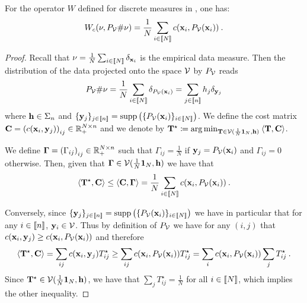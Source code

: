 \begin{lemma}
    For the operator $W$ defined for discrete measures in , one has:
    \begin{align}
        W_c(\nu, P_{{\mathcal{V}}} \# \nu) = \frac{1}{N} \sum_{i \in {[\![N]\!]}} c(\mathbf{x}_i, P_{{\mathcal{V}}}(\mathbf{x}_i)) \:.
    \end{align}
\end{lemma}

\begin{proof}
Recall that $\nu = \frac{1}{N} \sum_{i \in {[\![N]\!]}} \delta_{{\mathbf{x}}_i}$ is the empirical data measure. Then the distribution of the data projected onto the space ${\mathcal{V}}$ by $P_{{\mathcal{V}}}$ reads
\begin{align}
    P_{{\mathcal{V}}} \# \nu = \frac{1}{N} \sum_{i \in {[\![N]\!]}} \delta_{P_{{\mathcal{V}}}({\mathbf{x}}_{i})} = \sum_{j \in {[\![n]\!]}} h_j \delta_{{\mathbf{y}}_{j}}
\end{align} 
where ${\mathbf{h}} \in \Sigma_n$ and $\{{\mathbf{y}}_j \}_{j \in {[\![n]\!]}} = \text{supp}\left( \{P_{{\mathcal{V}}}({\mathbf{x}}_{i}) \}_{i \in {[\![N]\!]}} \right)$. We define the cost matrix ${\mathbf{C}} = \left( c({\mathbf{x}}_i, {\mathbf{y}}_j) \right)_{ij} \in \mathbb{R}_+^{N \times n}$ and we denote by ${\mathbf{T}}^\star \coloneqq \operatorname*{arg\,min}_{{\mathbf{T}} \in {\mathcal{V}}(\frac{1}{N} \bm{1}_N, {\mathbf{h}})} \: \langle {\mathbf{T}}, {\mathbf{C}} \rangle$.

We define $\mathbf{\Gamma} = \left( \Gamma_{ij} \right)_{ij} \in \mathbb{R}_+^{N \times n}$ such that $\Gamma_{ij} = \frac{1}{N}$ if ${\mathbf{y}}_j = P_{{\mathcal{V}}}({\mathbf{x}}_i)$ and $\Gamma_{ij} = 0$ otherwise.
Then, given that $\mathbf{\Gamma} \in {\mathcal{V}}(\frac{1}{N} \bm{1}_N, {\mathbf{h}})$ we have that
\begin{align}
    \langle {\mathbf{T}}^\star, {\mathbf{C}} \rangle \leq \langle {\mathbf{C}}, \mathbf{\Gamma} \rangle = \frac{1}{N} \sum_{i \in {[\![N]\!]}} c(\mathbf{x}_i, P_{{\mathcal{V}}}(\mathbf{x}_i)) \:.
\end{align}

Conversely, since $\{{\mathbf{y}}_j \}_{j \in {[\![n]\!]}} = \text{supp}\left( \{P_{{\mathcal{V}}}({\mathbf{x}}_{i}) \}_{i \in {[\![N]\!]}} \right)$ we have in particular that for any $i \in {[\![n]\!]}$, ${\mathbf{y}}_i \in {\mathcal{V}}$. Thus by definition of $P_{{\mathcal{V}}}$ we have for any $(i,j)$ that $c({\mathbf{x}}_i, {\mathbf{y}}_j) \geq c({\mathbf{x}}_i, P_{{\mathcal{V}}}({\mathbf{x}}_i))$ and therefore
\begin{align}
    \langle {\mathbf{T}}^\star, {\mathbf{C}} \rangle = \sum_{ij} c({\mathbf{x}}_i, {\mathbf{y}}_j) T^\star_{ij} \geq \sum_{ij} c({\mathbf{x}}_i, P_{{\mathcal{V}}}({\mathbf{x}}_i)) T^\star_{ij} = \sum_{i} c({\mathbf{x}}_i, P_{{\mathcal{V}}}({\mathbf{x}}_i)) \sum_j T^\star_{ij} \:. 
\end{align}
Since ${\mathbf{T}}^\star \in {\mathcal{V}}(\frac{1}{N} \bm{1}_N, {\mathbf{h}})$, we have that $\sum_j T^\star_{ij} = \frac{1}{N}$ for all $i \in {[\![N]\!]}$, which implies the other inequality.

\end{proof}

